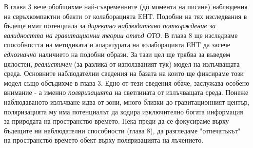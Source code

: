 В глава 3 вече обобщихме най-съвременните (до момента на писане) наблюдения на свръхкомпактни обекти от колаборацията EHT. Подобни на тях изследвания в бъдеще имат потенциала за \emph{директно наблюдателно потвърждение за валидността на гравитационни теории отвъд ОТО}. В глава 8 ще изследваме способността на методиката и апаратурата на колаборацията EHT да засече \emph{еднозначно} наличието на подобни образи. За тази цел ще трябва за въведем цялостен, \emph{реалистичен} (за разлика от използваният тук) модел на излъчващата среда. Основните наблюдателни сведения на базата на които ще фиксираме този модел също обсъдихме в глава 3. Едно от тези сведения обаче, заслужава особено внимание - а именно \emph{поляризацията} на светлината от излъчващата среда. Понеже наблюдаваното излъчване идва от зони, много близки до гравитационният център, поляризацията му има потенциалът да кодира изключително богата информация за природата на пространство-времето. Нека преди да се фокусираме върху бъдещите ни наблюдателни способности (глава 8), да разгледаме "отпечатъкът"$\,$ на пространство-времето обект върху поляризацията на лъчението. 




\newpage